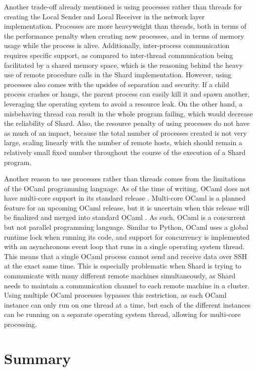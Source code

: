\documentclass[twoside]{report}
\begin{document}
Another trade-off already mentioned is using processes rather than threads for creating the Local Sender and Local Receiver in the network layer implementation.
Processes are more heavyweight than threads, both in terms of the performance penalty when creating new processes, and in terms of memory usage while the process is alive.
Additionally, inter-process communication requires specific support, as compared to inter-thread communication being facilitated by a shared memory space, which is the reasoning behind the heavy use of remote procedure calls in the Shard implementation.
However, using processes also comes with the upsides of separation and security.
If a child process crashes or hangs, the parent process can easily kill it and spawn another, leveraging the operating system to avoid a resource leak.
On the other hand, a misbehaving thread can result in the whole program failing, which would decrease the reliability of Shard.
Also, the resource penalty of using processes do not have as much of an impact, because the total number of processes created is not very large, scaling linearly with the number of remote hosts, which should remain a relatively small fixed number throughout the course of the execution of a Shard program.

Another reason to use processes rather than threads comes from the limitations of the OCaml programming language.
As of the time of writing, OCaml does not have multi-core support in its standard release
\cite{dolan2014multicore}.
Multi-core OCaml is a planned feature for an upcoming OCaml release, but it is uncertain when this release will be finalized and merged into standard OCaml \cite{sivaramakrishnan2020retrofitting}.
As such, OCaml is a concurrent but not parallel programming language.
Similar to Python, OCaml uses a global runtime lock when running its code, and support for concurrency is implemented with an asynchronous event loop that runs in a single operating system thread.
This means that a single OCaml process cannot send and receive data over SSH at the exact same time.
This is especially problematic when Shard is trying to communicate with many different remote machines simultaneously, as Shard needs to maintain a communication channel to each remote machine in a cluster.
Using multiple OCaml processes bypasses this restriction, as each OCaml instance can only run on one thread at a time, but each of the different instances can be running on a separate operating system thread, allowing for multi-core processing.

\section{Summary}
\end{document}
